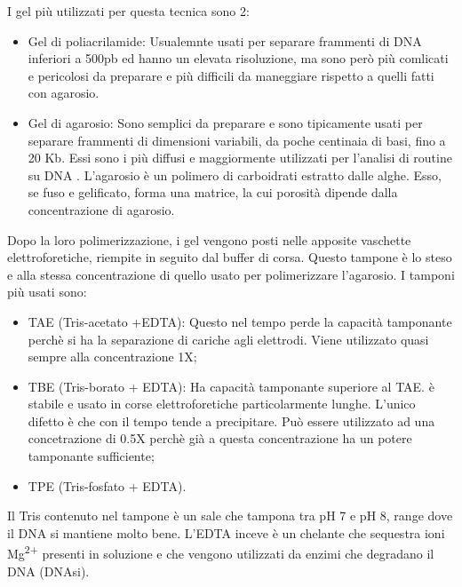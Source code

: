 I gel più utilizzati per questa tecnica sono 2:
\begin{itemize}

	\item{Gel di poliacrilamide: } Usualemnte usati per separare frammenti di DNA inferiori a 500pb ed hanno un elevata risoluzione, ma sono però più comlicati e pericolosi da preparare e più difficili da maneggiare rispetto a quelli fatti con agarosio.

	\item{Gel di agarosio: } Sono semplici da preparare e sono tipicamente usati per separare frammenti di dimensioni variabili, da poche centinaia di basi, fino a 20 Kb. Essi sono i più diffusi e maggiormente utilizzati per l'analisi di routine su DNA .  L'agarosio è un polimero di carboidrati estratto dalle alghe. Esso, se fuso e gelificato, forma una matrice, la cui porosità dipende dalla concentrazione di agarosio.

\end{itemize}

Dopo la loro polimerizzazione, i gel vengono posti nelle apposite vaschette elettroforetiche, riempite in seguito dal buffer di corsa.
Questo tampone è lo steso e alla stessa concentrazione di quello usato per polimerizzare l'agarosio.
\vspace{0.3cm}
I tamponi più usati sono:
\begin{itemize}

\item{TAE (Tris-acetato +EDTA): } Questo nel tempo perde la capacità tamponante perchè si ha la separazione di cariche agli elettrodi. Viene utilizzato quasi sempre alla concentrazione 1X;

\item{TBE (Tris-borato + EDTA):} Ha capacità tamponante superiore al TAE. è stabile e usato in corse elettroforetiche particolarmente lunghe. L'unico difetto è che con il tempo tende a precipitare. Può essere utilizzato ad una concetrazione di 0.5X perchè già a questa concentrazione ha un potere tamponante sufficiente;

\item{TPE (Tris-fosfato + EDTA).}

 \end{itemize}

Il Tris contenuto nel tampone è un sale che tampona tra pH 7 e pH 8, range dove il DNA si mantiene molto bene. L'EDTA inceve è un chelante che sequestra ioni Mg\textsuperscript{2+} presenti in soluzione e che vengono utilizzati da enzimi che degradano il DNA (DNAsi).

